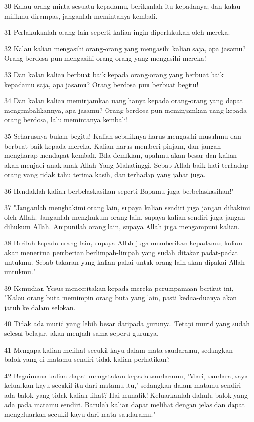 \par 30 Kalau orang minta sesuatu kepadamu, berikanlah itu kepadanya; dan kalau milikmu dirampas, janganlah memintanya kembali.
\par 31 Perlakukanlah orang lain seperti kalian ingin diperlakukan oleh mereka.
\par 32 Kalau kalian mengasihi orang-orang yang mengasihi kalian saja, apa jasamu? Orang berdosa pun mengasihi orang-orang yang mengasihi mereka!
\par 33 Dan kalau kalian berbuat baik kepada orang-orang yang berbuat baik kepadamu saja, apa jasamu? Orang berdosa pun berbuat begitu!
\par 34 Dan kalau kalian meminjamkan uang hanya kepada orang-orang yang dapat mengembalikannya, apa jasamu? Orang berdosa pun meminjamkan uang kepada orang berdosa, lalu memintanya kembali!
\par 35 Seharusnya bukan begitu! Kalian sebaliknya harus mengasihi musuhmu dan berbuat baik kepada mereka. Kalian harus memberi pinjam, dan jangan mengharap mendapat kembali. Bila demikian, upahmu akan besar dan kalian akan menjadi anak-anak Allah Yang Mahatinggi. Sebab Allah baik hati terhadap orang yang tidak tahu terima kasih, dan terhadap yang jahat juga.
\par 36 Hendaklah kalian berbelaskasihan seperti Bapamu juga berbelaskasihan!"
\par 37 "Janganlah menghakimi orang lain, supaya kalian sendiri juga jangan dihakimi oleh Allah. Janganlah menghukum orang lain, supaya kalian sendiri juga jangan dihukum Allah. Ampunilah orang lain, supaya Allah juga mengampuni kalian.
\par 38 Berilah kepada orang lain, supaya Allah juga memberikan kepadamu; kalian akan menerima pemberian berlimpah-limpah yang sudah ditakar padat-padat untukmu. Sebab takaran yang kalian pakai untuk orang lain akan dipakai Allah untukmu."
\par 39 Kemudian Yesus menceritakan kepada mereka perumpamaan berikut ini, "Kalau orang buta memimpin orang buta yang lain, pasti kedua-duanya akan jatuh ke dalam selokan.
\par 40 Tidak ada murid yang lebih besar daripada gurunya. Tetapi murid yang sudah selesai belajar, akan menjadi sama seperti gurunya.
\par 41 Mengapa kalian melihat secukil kayu dalam mata saudaramu, sedangkan balok yang di matamu sendiri tidak kalian perhatikan?
\par 42 Bagaimana kalian dapat mengatakan kepada saudaramu, 'Mari, saudara, saya keluarkan kayu secukil itu dari matamu itu,' sedangkan dalam matamu sendiri ada balok yang tidak kalian lihat? Hai munafik! Keluarkanlah dahulu balok yang ada pada matamu sendiri. Barulah kalian dapat melihat dengan jelas dan dapat mengeluarkan secukil kayu dari mata saudaramu."
